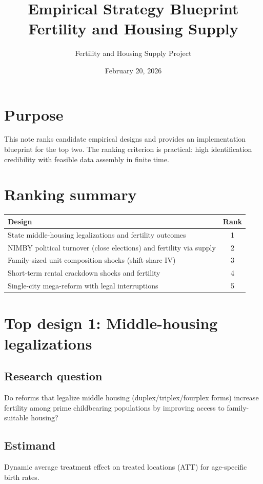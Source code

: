\documentclass[11pt]{article}
\title{Empirical Strategy Blueprint\\Fertility and Housing Supply}
\author{Fertility and Housing Supply Project}
\date{February 20, 2026}
\begin{document}
\maketitle

\section*{Purpose}
This note ranks candidate empirical designs and provides an implementation blueprint for the top two. The ranking criterion is practical: high identification credibility with feasible data assembly in finite time.

\section{Ranking summary}
\begin{center}
\begin{tabular}{p{}c}
\toprule
Design & Rank \\
\midrule
State middle-housing legalizations and fertility outcomes & 1 \\
NIMBY political turnover (close elections) and fertility via supply & 2 \\
Family-sized unit composition shocks (shift-share IV) & 3 \\
Short-term rental crackdown shocks and fertility & 4 \\
Single-city mega-reform with legal interruptions & 5 \\
\bottomrule
\end{tabular}
\end{center}

\section{Top design 1: Middle-housing legalizations}
\subsection*{Research question}
Do reforms that legalize middle housing (duplex/triplex/fourplex forms) increase fertility among prime childbearing populations by improving access to family-suitable housing?

\subsection*{Estimand}
Dynamic average treatment effect on treated locations (ATT) for age-specific birth rates.
\end{document}
